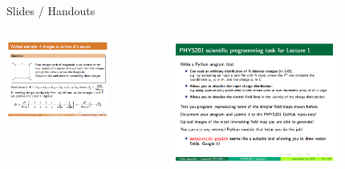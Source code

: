 \begin{frame}{Slides / Handouts}
\begin{columns}
  \begin{column}{0.50\textwidth}
   \begin{center}
     \includegraphics[width=0.7\textwidth]{./images/example_slides/worked_example.png}\\
   \end{center}
  \end{column}
  \begin{column}{0.50\textwidth}
   \begin{center}
     \includegraphics[width=0.7\textwidth]{./images/example_slides/python.png}\\
   \end{center}
  \end{column}
\end{columns}

\end{frame}


%
%
%


